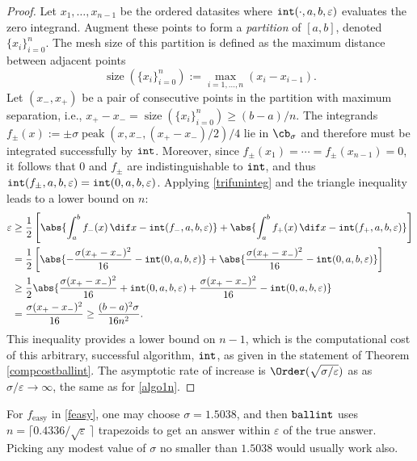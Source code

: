\documentclass[]{article}
\DeclareMathOperator{\goodinteg}{\texttt{\textup{int}}}
\DeclareMathOperator{\ballinteg}{\texttt{\textup{ballint}}}
\DeclareMathOperator{\size}{size}
\theoremstyle{definition}
\theoremstyle{remark}
\DeclareMathOperator{\tri}{peak}
\newcommand{\datasites}{\{x_i\}_{i=0}^n}
\begin{document}
\begin{proof}
Let $x_1, \ldots, x_{n-1}$ be the ordered datasites where $\goodinteg(\cdot,a,b,\varepsilon)$ evaluates the zero integrand.  Augment these points to form a \emph{partition} of $[a,b]$, denoted  $\datasites$. The mesh size of this partition is defined as the maximum distance between adjacent points
\begin{equation}
\size(\datasites):= \max_{i=1, \dots, n} (x_i - x_{i-1}).
\end{equation}
Let $(x_-,x_+)$ be a pair of consecutive points in the partition with maximum separation, i.e., $x_+ -x_- = \size(\datasites) \ge (b-a)/n$.  The integrands $f_{\pm}(x) := \pm \sigma \tri(x,x_-,(x_+-x_-)/2)/4$ lie in $\cb_\sigma$ and therefore must be integrated successfully by $\goodinteg$.  Moreover, since $f_{\pm}(x_1)=\cdots = f_{\pm}(x_{n-1}) = 0$, it follows that $0$ and $f_{\pm}$ are indistinguishable to $\goodinteg$, and thus 
$\goodinteg(f_\pm,a,b,\varepsilon)=\goodinteg(0,a,b,\varepsilon)$.  
Applying \eqref{trifuninteg} and the triangle inequality leads to a lower bound on $n$: 
\begin{align*}
\varepsilon & \ge \frac{1}{2}\left [ \abs{\int_a^b f_-(x) \, \dif x - \goodinteg(f_-,a,b,\varepsilon)} + \abs{\int_a^b f_+(x) \, \dif x - \goodinteg(f_+,a,b,\varepsilon)} \right] \\
& = \frac{1}{2}\left [ \abs{-\frac{\sigma (x_+ -x_-)^2}{16}- \goodinteg(0,a,b,\varepsilon)} + \abs{\frac{\sigma( x_+-x_-)^2}{16} - \goodinteg(0,a,b,\varepsilon)} \right]\\
& \ge \frac{1}{2} \abs{\frac{\sigma ( x_+-x_-)^2}{16}+ \goodinteg(0,a,b,\varepsilon) + \frac{\sigma( x_+-x_-)^2}{16} - \goodinteg(0,a,b,\varepsilon)} \\
& = \frac{\sigma( x_+-x_-)^2}{16} \ge \frac{(b-a)^2 \sigma}{16 n^2 }.
\end{align*}
This inequality provides a lower bound on $n-1$, which is the computational cost of this arbitrary, successful algorithm, $\goodinteg$, as given in the statement of Theorem \ref{compcostballint}.  The asymptotic rate of increase is $\Order(\sqrt{\sigma/\varepsilon})$ as as $\sigma/\varepsilon \to \infty$, the same as for \eqref{algo1n}.
\end{proof}

For $f_{\text{easy}}$ in \eqref{feasy}, one may choose $\sigma=1.5038$, and then $\ballinteg$ uses $n = \lceil 0.4336/\sqrt{\varepsilon}\, \rceil$ trapezoids to get an answer within $\varepsilon$ of the true answer. Picking any modest value of $\sigma$ no smaller than $1.5038$ would usually work also.  
\end{document}
